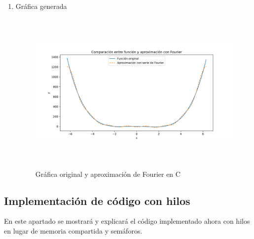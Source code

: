 \begin{enumerate}
	\item Gráfica generada
	
	\begin{figure}[H]
		\centering
		\includegraphics[width=6.26772in,height=3.13889in]{media/image12.png}
		\caption{Gráfica original y aproximación de Fourier en C}
	\end{figure}
	
\end{enumerate}

\subsection{Implementación de código con hilos}

En este apartado se mostrará y explicará el código implementado ahora con hilos en lugar de memoria compartida y semáforos.

